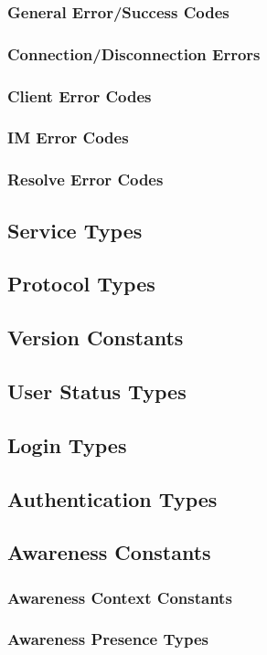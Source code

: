\documentclass[titlepage,oneside]{book}
\begin{document}
\subsubsection{General Error/Success Codes}
\subsubsection{Connection/Disconnection Errors}
\subsubsection{Client Error Codes}
\subsubsection{IM Error Codes}
\subsubsection{Resolve Error Codes}

\subsection{Service Types}
\subsection{Protocol Types}
\subsection{Version Constants}
\subsection{User Status Types}
\subsection{Login Types}
\subsection{Authentication Types}
\subsection{Awareness Constants}
\subsubsection{Awareness Context Constants}
\subsubsection{Awareness Presence Types}
\end{document}
